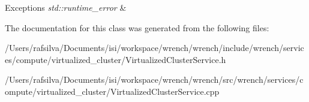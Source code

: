 \begin{DoxyExceptions}{Exceptions}
{\em std\+::runtime\+\_\+error} & \\
\hline
\end{DoxyExceptions}


The documentation for this class was generated from the following files\+:\begin{DoxyCompactItemize}
\item 
/\+Users/rafsilva/\+Documents/isi/workspace/wrench/wrench/include/wrench/services/compute/virtualized\+\_\+cluster/Virtualized\+Cluster\+Service.\+h\item 
/\+Users/rafsilva/\+Documents/isi/workspace/wrench/wrench/src/wrench/services/compute/virtualized\+\_\+cluster/Virtualized\+Cluster\+Service.\+cpp\end{DoxyCompactItemize}
